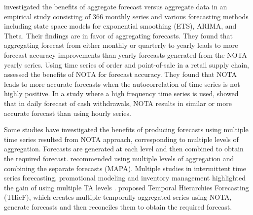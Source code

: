 \documentclass[preprint, 3p,
authoryear]{elsarticle} %
\begin{document}
\citet{athanasopoulos2011tourism} investigated the benefits of aggregate
forecast versus aggregate data in an empirical study consisting of 366
monthly series and various forecasting methods including state space
models for exponential smoothing (ETS), ARIMA, and Theta. Their findings
are in favor of aggregating forecasts. They found that aggregating
forecast from either monthly or quarterly to yearly leads to more
forecast accuracy improvements than yearly forecasts generated from the
NOTA yearly series. Using time series of order and point-of-sale in a
retail supply chain, \citet{jin2015forecasting} assessed the benefits of
NOTA for forecast accuracy. They found that NOTA leads to more accurate
forecasts when the autocorrelation of time series is not highly
positive. In a study where a high frequency time series is used,
\citet{luna2011top} showed that in daily forecast of cash withdrawals,
NOTA results in similar or more accurate forecast than using hourly
series.

Some studies have investigated the benefits of producing forecasts using
multiple time series resulted from NOTA approach, corresponding to
multiple levels of aggregation. Forecasts are generated at each level
and then combined to obtain the required forecast.
\citet{kourentzes2014improving} recommended using multiple levels of
aggregation and combining the separate forecasts (MAPA). Multiple
studies in intermittent time series forecasting, promotional modeling
and inventory management highlighted the gain of using multiple TA
levels
\citep{petropoulos2014forecast, kourentzes2015forecasting, barrow2016distributions}.
\citet{athanasopoulos2017forecasting} proposed Temporal Hierarchies
Forecasting (THieF), which creates multiple temporally aggregated series
using NOTA, generate forecasts and then reconciles them to obtain the
required forecast.
\end{document}
